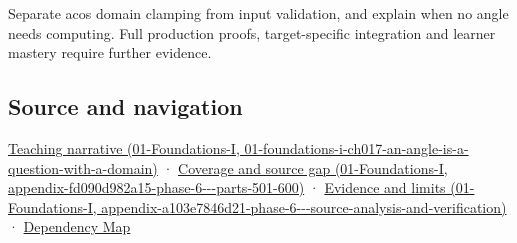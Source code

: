 Separate acos domain clamping from input validation, and explain when no angle needs computing. Full production proofs, target-specific integration and learner mastery require further evidence.

\subsection{Source and navigation}\label{appendix-e569e60e18e6-source-and-navigation}

\href{../01-Foundations-I/main.pdf\#nameddest=01-foundations-i-ch017-an-angle-is-a-question-with-a-domain}{Teaching narrative (01-Foundations-I, 01-foundations-i-ch017-an-angle-is-a-question-with-a-domain)} · \href{../01-Foundations-I/main.pdf\#nameddest=appendix-fd090d982a15-phase-6---parts-501-600}{Coverage and source gap (01-Foundations-I, appendix-fd090d982a15-phase-6-\/-\/-parts-501-600)} · \href{../01-Foundations-I/main.pdf\#nameddest=appendix-a103e7846d21-phase-6---source-analysis-and-verification}{Evidence and limits (01-Foundations-I, appendix-a103e7846d21-phase-6-\/-\/-source-analysis-and-verification)} · \hyperref[appendix-4ad47bdd269a]{Dependency Map}
